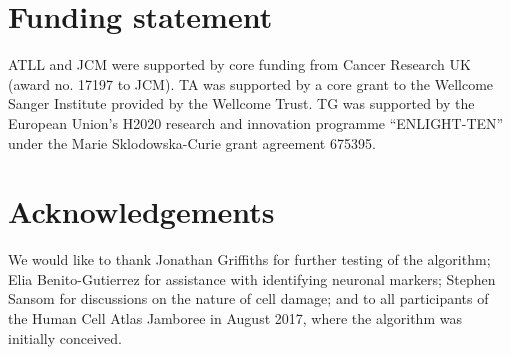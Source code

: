 \documentclass[10pt,letterpaper]{article}
\begin{document}
\section*{Funding statement}
ATLL and JCM were supported by core funding from Cancer Research UK (award no. 17197 to JCM).
TA was supported by a core grant to the Wellcome Sanger Institute provided by the Wellcome Trust.
TG was supported by the European Union's H2020 research and innovation programme ``ENLIGHT-TEN'' under the Marie Sklodowska-Curie grant agreement 675395.

\section*{Acknowledgements}
We would like to thank Jonathan Griffiths for further testing of the algorithm;
Elia Benito-Gutierrez for assistance with identifying neuronal markers;
Stephen Sansom for discussions on the nature of cell damage;
and to all participants of the Human Cell Atlas Jamboree in August 2017, where the algorithm was initially conceived.



\end{document}
